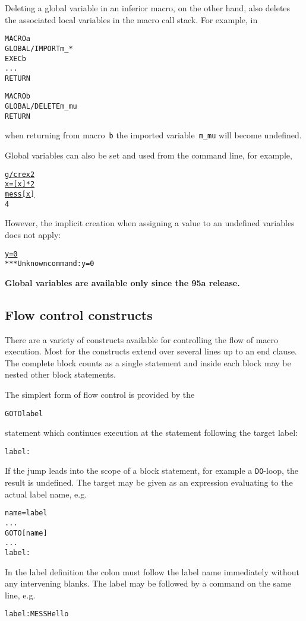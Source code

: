 Deleting a global variable in an inferior macro, on the other hand,
also deletes the associated local variables in the macro call stack.
For example, in
\begin{alltt}
MACRO a
GLOBAL/IMPORT m_*
EXEC b
...
RETURN

MACRO b
GLOBAL/DELETE m_mu
RETURN
\end{alltt}
when returning from macro~\texttt{b} the imported variable~\texttt{m\_mu}
will become undefined.

Global variables can also be set and used from the command line,
for example,
\begin{alltt}
\PROMPT{} \underline{g/cre x 2}
\PROMPT{} \underline{x=[x]*2}
\PROMPT{} \underline{mess [x]}
 4
\end{alltt}
However, the implicit creation when assigning a value to an undefined
variables does not apply:
\begin{alltt}
\PROMPT{} \underline{y=0}
 *** Unknown command: y=0
\end{alltt}

\textbf{Global variables are available only since the 95a release.}


\subsection{Flow control constructs}
 
There are a variety of constructs
available for controlling the flow of macro execution.
Most for the constructs extend over several lines up to an end clause.
The complete block counts as a single statement and inside each block
may be nested other block statements. 

The simplest form of flow control is provided by the 
\begin{alltt}
GOTO label
\end{alltt}
statement which continues execution at the statement following the
target label:
\begin{alltt}
label:
\end{alltt}
If the jump leads into the scope of a block statement, for example a
\texttt{DO}-loop, the result is undefined.
The target may be given as an expression evaluating to the actual
label name, e.g.\ 
\begin{alltt}
name = label
  ...
GOTO [name]
  ...
label:
\end{alltt}

In the label definition the colon must follow the label name
immediately without any intervening blanks.
The label may be followed by a command on the same line, e.g.\
\begin{alltt}
label: MESS Hello
\end{alltt}

